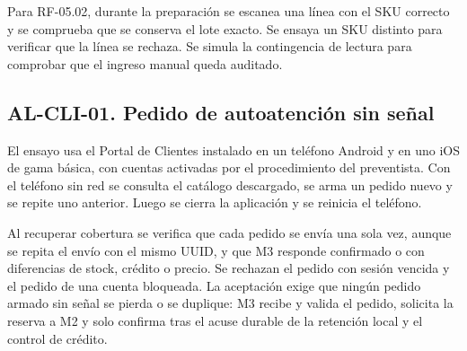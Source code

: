 Para RF-05.02, durante la preparación se escanea una línea con el SKU correcto y se comprueba que se conserva el lote exacto. Se ensaya un SKU distinto para verificar que la línea se rechaza. Se simula la contingencia de lectura para comprobar que el ingreso manual queda auditado.

\subsection*{AL-CLI-01. Pedido de autoatención sin señal}
El ensayo usa el Portal de Clientes instalado en un teléfono Android y en uno iOS de gama básica, con cuentas activadas por el procedimiento del preventista. Con el teléfono sin red se consulta el catálogo descargado, se arma un pedido nuevo y se repite uno anterior. Luego se cierra la aplicación y se reinicia el teléfono.

Al recuperar cobertura se verifica que cada pedido se envía una sola vez, aunque se repita el envío con el mismo UUID, y que M3 responde confirmado o con diferencias de stock, crédito o precio. Se rechazan el pedido con sesión vencida y el pedido de una cuenta bloqueada. La aceptación exige que ningún pedido armado sin señal se pierda o se duplique: M3 recibe y valida el pedido, solicita la reserva a M2 y solo confirma tras el acuse durable de la retención local y el control de crédito.

